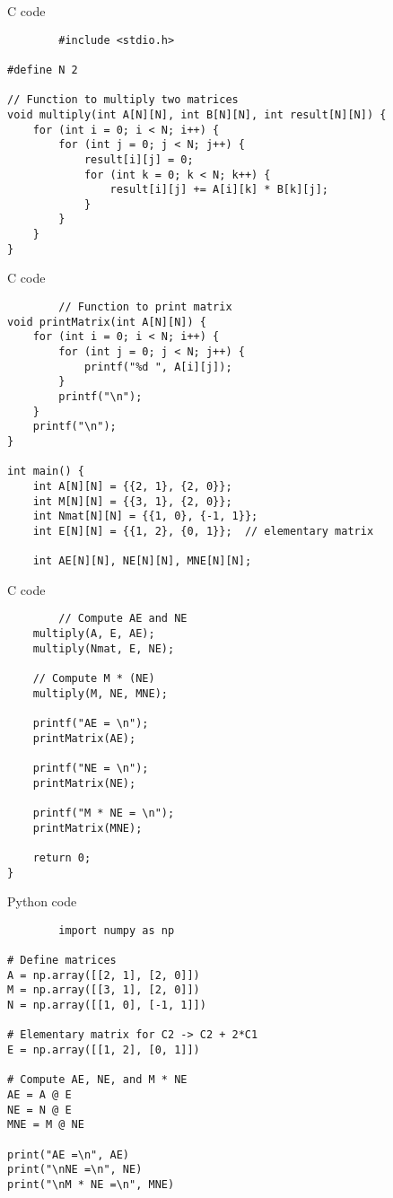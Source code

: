 \documentclass{beamer}
\begin{document}
\begin{frame}[fragile]{C code}
    \begin{lstlisting}
        #include <stdio.h>

#define N 2

// Function to multiply two matrices
void multiply(int A[N][N], int B[N][N], int result[N][N]) {
    for (int i = 0; i < N; i++) {
        for (int j = 0; j < N; j++) {
            result[i][j] = 0;
            for (int k = 0; k < N; k++) {
                result[i][j] += A[i][k] * B[k][j];
            }
        }
    }
}
    \end{lstlisting}
\end{frame}

\begin{frame}[fragile]{C code}
    \begin{lstlisting}
        // Function to print matrix
void printMatrix(int A[N][N]) {
    for (int i = 0; i < N; i++) {
        for (int j = 0; j < N; j++) {
            printf("%d ", A[i][j]);
        }
        printf("\n");
    }
    printf("\n");
}

int main() {
    int A[N][N] = {{2, 1}, {2, 0}};
    int M[N][N] = {{3, 1}, {2, 0}};
    int Nmat[N][N] = {{1, 0}, {-1, 1}};
    int E[N][N] = {{1, 2}, {0, 1}};  // elementary matrix

    int AE[N][N], NE[N][N], MNE[N][N];
    \end{lstlisting}
\end{frame}

\begin{frame}[fragile]{C code}
    \begin{lstlisting}
        // Compute AE and NE
    multiply(A, E, AE);
    multiply(Nmat, E, NE);

    // Compute M * (NE)
    multiply(M, NE, MNE);

    printf("AE = \n");
    printMatrix(AE);

    printf("NE = \n");
    printMatrix(NE);

    printf("M * NE = \n");
    printMatrix(MNE);

    return 0;
}
    \end{lstlisting}
\end{frame}

\begin{frame}[fragile]{Python code}
    \begin{lstlisting}
        import numpy as np

# Define matrices
A = np.array([[2, 1], [2, 0]])
M = np.array([[3, 1], [2, 0]])
N = np.array([[1, 0], [-1, 1]])

# Elementary matrix for C2 -> C2 + 2*C1
E = np.array([[1, 2], [0, 1]])

# Compute AE, NE, and M * NE
AE = A @ E
NE = N @ E
MNE = M @ NE

print("AE =\n", AE)
print("\nNE =\n", NE)
print("\nM * NE =\n", MNE)
    \end{lstlisting}
\end{frame}
\end{document}
